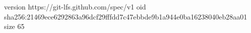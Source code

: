 version https://git-lfs.github.com/spec/v1
oid sha256:21469ece6292863a96dcf29fffdd7c47ebbde9b1a944e0ba16238040eb28aa01
size 65
